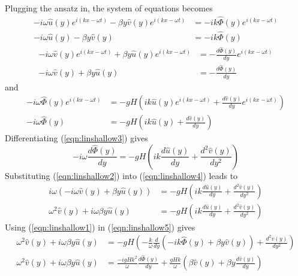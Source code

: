 \begin{solution}
Plugging the ansatz in, the system of equations becomes
\begin{align}
-i\omega \hat{u}(y) e^{i(kx-\omega t)} - \beta y \hat{v}(y)e^{i(kx-\omega t)} &= -i k \hat{\Phi}(y)e^{i(kx-\omega t)} \nonumber\\
-i\omega \hat{u}(y) - \beta y \hat{v}(y) &= -i k \hat{\Phi}(y) \label{eqn:linshallow1}
\end{align}
\begin{align}
-i\omega \hat{v}(y)e^{i(kx-\omega t)} + \beta y \hat{u}(y)e^{i(kx-\omega t)} &= -\frac{d\hat{\Phi}(y)}{dy}e^{i(kx-\omega t)} \nonumber\\
-i\omega \hat{v}(y) + \beta y \hat{u}(y) &= -\frac{d\hat{\Phi}(y)}{dy} \label{eqn:linshallow2}
\end{align}
and
\begin{align}
-i\omega \hat{\Phi}(y)e^{i(kx-\omega t)} &= - gH\left(i k\hat{u}(y)e^{i(kx-\omega t)} + \frac{d\hat{v}(y)}{dy}e^{i(kx-\omega t)}\right) \nonumber\\
-i\omega \hat{\Phi}(y) &= - gH \left(ik\hat{u}(y) + \frac{d\hat{v}(y)}{dy}\right) \label{eqn:linshallow3} 
\end{align}
Differentiating (\ref{eqn:linshallow3}) gives
\begin{equation}
-i\omega \frac{d\hat{\Phi}(y)}{dy} = - gH \left(i k\frac{d\hat{u}(y)}{dy} + \frac{d^2\hat{v}(y)}{dy^2}\right) \label{eqn:linshallow4}      
\end{equation}
Substituting (\ref{eqn:linshallow2}) into (\ref{eqn:linshallow4}) leads to
\begin{align}
i\omega (-i\omega \hat{v}(y) + \beta y \hat{u}(y)) &= - gH\left(i k\frac{d\hat{u}(y)}{dy} + \frac{d^2\hat{v}(y)}{dy^2}\right) \nonumber \\
\omega^2 \hat{v}(y) + i \omega\beta y \hat{u}(y) &= - gH\left(i k\frac{d\hat{u}(y)}{dy} + \frac{d^2\hat{v}(y)}{dy^2}\right) \label{eqn:linshallow5}   
\end{align}
Using (\ref{eqn:linshallow1}) in (\ref{eqn:linshallow5}) gives
\begin{align}
\omega^2 \hat{v}(y) + i \omega\beta y \hat{u}(y) &= -gH\left(-\frac{k}{\omega} \frac{d}{dy} (-i k \hat{\Phi}(y) + \beta y\hat{v}(y)) + \frac{d^2\hat{v}(y)}{dy^2}\right) \nonumber \\
\omega^2 \hat{v}(y) + i \omega\beta y \hat{u}(y) &= 
\frac{-i gHk^2}{\omega}\frac{d\hat{\Phi}(y)}{dy} + \frac{gHk}{\omega}\left(\beta\hat{v}(y) + \beta y\frac{d\hat{v}(y)}{dy}\right) \nonumber \\ 

\end{align}
\end{solution}
